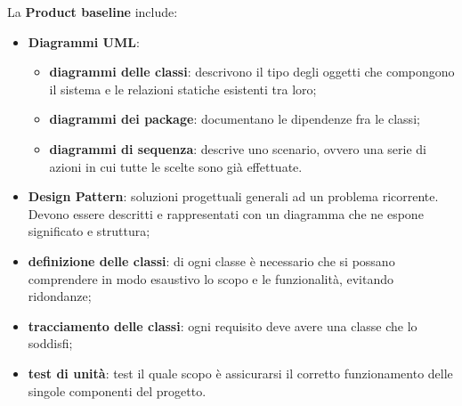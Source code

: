 La \textbf{Product baseline} include:
\begin{itemize}
\item \textbf{Diagrammi UML}:
\begin{itemize}
\item \textbf{diagrammi delle classi}: descrivono il tipo degli oggetti che compongono il sistema e le relazioni statiche esistenti tra loro;
\item \textbf{diagrammi dei package}: documentano le dipendenze fra le classi;
\item \textbf{diagrammi di sequenza}: descrive uno scenario, ovvero una serie di azioni in cui tutte le scelte sono già effettuate.
\end{itemize}
\item \textbf{Design Pattern}: soluzioni progettuali generali ad un problema ricorrente. Devono essere descritti e rappresentati con un diagramma che ne espone significato e struttura;
\item \textbf{definizione delle classi}: di ogni classe è necessario che si possano comprendere in modo esaustivo lo scopo e le funzionalità, evitando ridondanze;
\item \textbf{tracciamento delle classi}: ogni requisito deve avere una classe che lo soddisfi; 
\item \textbf{test di unità}: test il quale scopo è assicurarsi il corretto funzionamento delle singole componenti del progetto.
\end{itemize}